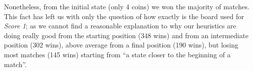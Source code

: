 \documentclass{article}
\begin{document}
Nonetheless, from the initial state (only 4 coins) we won the majority of matches. This fact has left us with only the question of how exactly is the board used for \emph{Score 1}; as we cannot find a reasonable explanation to why our heuristics are doing really good from the starting position (348 wins) and from an intermediate position (302 wins), above average from a final position (190 wins), but losing most matches (145 wins) starting from ``a state closer to the beginning of a match''.



\newpage

\printbibliography[heading=bibintoc]
\end{document}
